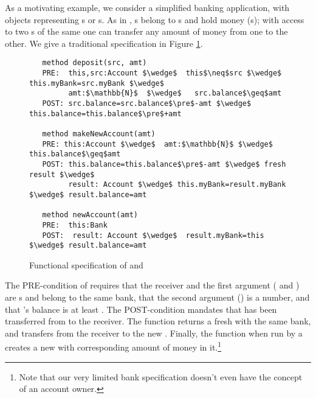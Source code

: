 

As a motivating example, we consider a simplified banking application,
with objects representing s or s. 
As in \cite{ELang},   s belong to s and hold money (s);  
with access  to two s of the same   one can  transfer any amount of money from
 one to the other.  We give a traditional specification in Figure \ref{fig:BankSpec}.

\begin{figure}[htbp] 
\begin{lstlisting}
   method deposit(src, amt)
   PRE:  this,src:Account $\wedge$  this$\neq$src $\wedge$ this.myBank=src.myBank $\wedge$ 
         amt:$\mathbb{N}$  $\wedge$   src.balance$\geq$amt
   POST: src.balance=src.balance$\pre$-amt $\wedge$ this.balance=this.balance$\pre$+amt

   method makeNewAccount(amt)
   PRE: this:Account $\wedge$  amt:$\mathbb{N}$ $\wedge$  this.balance$\geq$amt
   POST: this.balance=this.balance$\pre$-amt $\wedge$ fresh result $\wedge$ 
         result: Account $\wedge$ this.myBank=result.myBank $\wedge$ result.balance=amt

   method newAccount(amt)
   PRE:  this:Bank  
   POST:  result: Account $\wedge$  result.myBank=this $\wedge$ result.balance=amt
 \end{lstlisting}
 \vspace{-.8cm}
\caption{Functional specification of  and 
%
}
\label{fig:functionalSpecBankAccount}
\label{fig:BankSpec}
\end{figure} 

The PRE-condition of  requires that  the receiver and the
first argument  ( and ) are s
and belong to the same bank,
that the second argument () is a number, and that 's
balance is at least .
The POST-condition mandates that  has been transferred from  to the receiver.
 The function   returns a fresh  with the same bank, and transfers 
 from the receiver  to the new .
 Finally, the function  when run by a  creates a new  with corresponding 
 amount of money in it.\footnote{{Note that our very limited bank specification doesn't even have the concept of an account owner.}}

